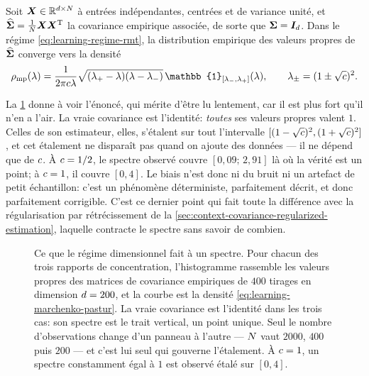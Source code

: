 \begin{property}
\label{prop:learning-marchenko-pastur}
  Soit $\boldsymbol{X}\in\mathbb{R}^{d\times N}$ à entrées indépendantes, centrées et de
  variance unité, et $\widehat{\boldsymbol{\Sigma}}=\frac{1}{N}\boldsymbol{X}\boldsymbol{X}^{\mathrm{T}}$ la covariance empirique
  associée, de sorte que $\boldsymbol{\Sigma}=\boldsymbol{I}_{d}$. Dans le régime
  \cref{eq:learning-regime-rmt}, la distribution empirique des valeurs propres
  de $\widehat{\boldsymbol{\Sigma}}$ converge vers la densité 
  \begin{equation}
    \MPdens(\eig)
    =
    \frac{1}{2\pi\cratio\eig}
    \sqrt{(\eig_+-\eig)(\eig-\eig_-)}\,
    \mathbb{1}_{[\eig_-,\eig_+]}(\eig),
    \qquad
    \eig_\pm=(1\pm\sqrt{\cratio})^2 .
    \label{eq:learning-marchenko-pastur}
  \end{equation}
\end{property}

\begin{remark}
\label{rem:learning-lecture-mp}
  La \cref{fig:learning-marchenko} donne à voir l'énoncé, qui mérite d'être lu
  lentement, car il est plus fort qu'il n'en a l'air. La vraie covariance est l'identité: \emph{toutes} ses valeurs propres
  valent $1$. Celles de son estimateur, elles, s'étalent sur tout l'intervalle
  $[(1-\sqrt{c})^2,(1+\sqrt{c})^2]$, et cet étalement ne disparaît
  pas quand on ajoute des données --- il ne dépend que de $c$. À
  $c=1/2$, le spectre observé couvre $[0{,}09;\,2{,}91]$ là où la vérité
  est un point; à $c=1$, il couvre $[0,4]$. Le biais n'est donc ni du
  bruit ni un artefact de petit échantillon: c'est un phénomène déterministe,
  parfaitement décrit, et donc parfaitement corrigible. C'est ce dernier point
  qui fait toute la différence avec la régularisation par rétrécissement de la
  \cref{sec:context-covariance-regularized-estimation}, laquelle contracte le
  spectre sans savoir de combien.
\end{remark}

\begin{figure}[htb]
  \centering
  
  \provMarchenkoQR[1cm]
  \caption[Loi de Mar\v{c}enko-Pastur]{Ce que le régime dimensionnel fait à un
    spectre. Pour chacun des trois rapports de concentration, l'histogramme
    rassemble les valeurs propres des matrices de covariance empiriques de
    $400$ tirages en dimension $d=200$, et la courbe est la densité
    \cref{eq:learning-marchenko-pastur}. La vraie covariance est l'identité
    dans les trois cas: son spectre est le trait vertical, un point unique.
    Seul le nombre d'observations change d'un panneau à l'autre --- $N$
    vaut $2000$, $400$ puis $200$ --- et c'est lui seul qui gouverne
    l'étalement. À $c=1$, un spectre constamment égal à $1$ est observé
    étalé sur $[0,4]$. \provMarchenko}
  \label{fig:learning-marchenko}
\end{figure}

